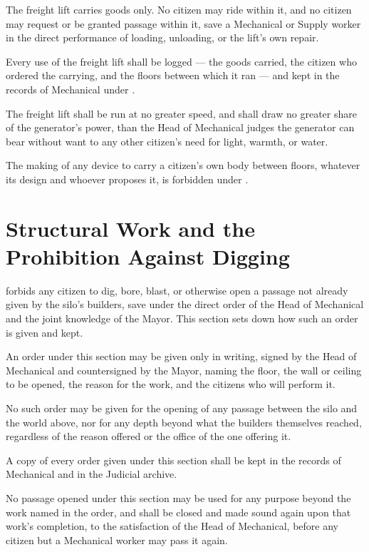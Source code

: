 \begin{clauses}
\item The freight lift carries goods only. No citizen may ride within it, and no citizen may request or be granted passage within it, save a Mechanical or Supply worker in the direct performance of loading, unloading, or the lift's own repair.
\item Every use of the freight lift shall be logged --- the goods carried, the citizen who ordered the carrying, and the floors between which it ran --- and kept in the records of Mechanical under .
\item The freight lift shall be run at no greater speed, and shall draw no greater share of the generator's power, than the Head of Mechanical judges the generator can bear without want to any other citizen's need for light, warmth, or water.
\item The making of any device to carry a citizen's own body between floors, whatever its design and whoever proposes it, is forbidden under .
\end{clauses}

\section{Structural Work and the Prohibition Against Digging}
\label{sec:mechanical:structural-work-and-the-prohibition-against-digging}

 forbids any citizen to dig, bore, blast, or otherwise open a passage not already given by the silo's builders, save under the direct order of the Head of Mechanical and the joint knowledge of the Mayor. This section sets down how such an order is given and kept.

\begin{clauses}
\item An order under this section may be given only in writing, signed by the Head of Mechanical and countersigned by the Mayor, naming the floor, the wall or ceiling to be opened, the reason for the work, and the citizens who will perform it.
\item No such order may be given for the opening of any passage between the silo and the world above, nor for any depth beyond what the builders themselves reached, regardless of the reason offered or the office of the one offering it.
\item A copy of every order given under this section shall be kept in the records of Mechanical and in the Judicial archive.
\item No passage opened under this section may be used for any purpose beyond the work named in the order, and shall be closed and made sound again upon that work's completion, to the satisfaction of the Head of Mechanical, before any citizen but a Mechanical worker may pass it again.
\end{clauses}

